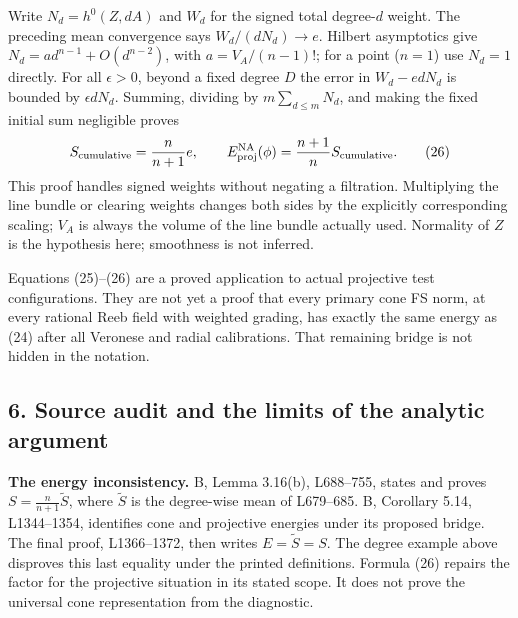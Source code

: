 \documentclass[
  11pt,
]{article}
\begin{document}
Write \(N_d=h^0(Z,dA)\) and \(W_d\) for the signed total degree-\(d\)
weight. The preceding mean convergence says \(W_d/(dN_d)\to e\). Hilbert
asymptotics give \(N_d=a d^{n-1}+O(d^{n-2})\), with \(a=V_A/(n-1)!\);
for a point (\(n=1\)) use \(N_d=1\) directly. For all \(\epsilon>0\),
beyond a fixed degree \(D\) the error in \(W_d-e dN_d\) is bounded by
\(\epsilon dN_d\). Summing, dividing by \(m\sum_{d\leq m}N_d\), and
making the fixed initial sum negligible proves \[
 S_{\rm cumulative}=\frac{n}{n+1}e,\qquad
 E^{\rm NA}_{\rm proj}(\phi)=\frac{n+1}{n}S_{\rm cumulative}.
 \tag{26}
\] This proof handles signed weights without negating a filtration.
Multiplying the line bundle or clearing weights changes both sides by
the explicitly corresponding scaling; \(V_A\) is always the volume of
the line bundle actually used. Normality of \(Z\) is the hypothesis
here; smoothness is not inferred.

Equations (25)--(26) are a proved application to actual projective test
configurations. They are not yet a proof that every primary cone FS
norm, at every rational Reeb field with weighted grading, has exactly
the same energy as (24) after all Veronese and radial calibrations. That
remaining bridge is not hidden in the notation.

\subsection{6. Source audit and the limits of the analytic
argument}\label{source-audit-and-the-limits-of-the-analytic-argument}

\textbf{The energy inconsistency.} B, Lemma 3.16(b), L688--755, states
and proves \(S=\frac{n}{n+1}\widetilde S\), where \(\widetilde S\) is
the degree-wise mean of L679--685. B, Corollary 5.14, L1344--1354,
identifies cone and projective energies under its proposed bridge. The
final proof, L1366--1372, then writes \(E=\widetilde S=S\). The degree
example above disproves this last equality under the printed
definitions. Formula (26) repairs the factor for the projective
situation in its stated scope. It does not prove the universal cone
representation from the diagnostic.
\end{document}
